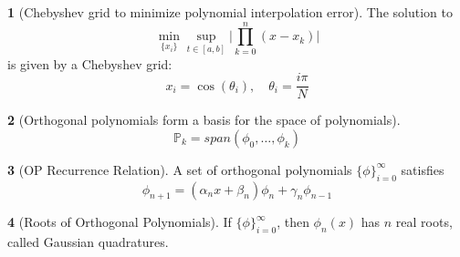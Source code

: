 \documentclass[12pt]{article}
\theoremstyle{definition}
\newtheorem{theorem}{\color{ForestGreen}{\textbf{Theorem}}}
\begin{document}
\begin{theorem}[Chebyshev grid to minimize polynomial interpolation error]
The solution to
\begin{equation}
\min_{\{x_i\}} \sup_{t \in [a,b]} \bigg\lvert \prod_{k=0}^n (x-x_k) \bigg\rvert
\end{equation}
is given by a Chebyshev grid:
\begin{equation}
x_i = \cos (\theta_i), \quad \theta_i = \frac{i\pi}{N}
\end{equation}
\end{theorem}

\begin{theorem}[Orthogonal polynomials form a basis for the space of polynomials]
\begin{equation}
\mathbb{P}_k = span(\phi_0,\ldots,\phi_k)
\end{equation}
\end{theorem}

\begin{theorem}[OP Recurrence Relation]
A set of orthogonal polynomials $\{\phi\}_{i=0}^\infty$ satisfies
\begin{equation}
\phi_{n+1} = (\alpha_n x + \beta_n)\phi_n + \gamma_n \phi_{n-1}
\end{equation}
\end{theorem}

\begin{theorem}[Roots of Orthogonal Polynomials]
If $\{\phi\}_{i=0}^\infty$, then $\phi_n(x)$ has $n$ real roots, called Gaussian quadratures.
\end{theorem}
\end{document}
